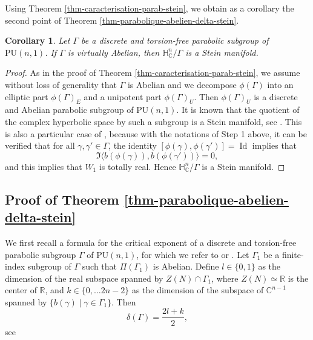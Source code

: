\documentclass{article}
\newtheorem{corollary}[theorem]{Corollary}
\theoremstyle{definition}
\theoremstyle{remark}
\newcommand{\C}{\mathbb{C}}
\newcommand{\R}{\mathbb{R}}
\newcommand{\HNC}{\mathbb{H}^{n}_{\C}}
\newcommand{\PU}{\mathrm{PU}}
\DeclareMathOperator{\Id}{\text{Id}}
\begin{document}
	Using Theorem \ref{thm-caracterisation-parab-stein}, we obtain as a corollary the second point of Theorem \ref{thm-parabolique-abelien-delta-stein}.
	
	\begin{corollary}\label{cor-virt-ab-stein}
		Let $\Gamma$ be a discrete and torsion-free parabolic subgroup of $\PU(n,1)$. If $\Gamma$ is virtually Abelian, then $\HNC/\Gamma$ is a Stein manifold.
	\end{corollary}
	
	\begin{proof}
		As in the proof of Theorem \ref{thm-caracterisation-parab-stein}, we assume without loss of generality that $\Gamma$ is Abelian and we decompose $\phi(\Gamma)$ into an elliptic part $\phi(\Gamma)_E$ and a unipotent part $\phi(\Gamma)_U$. Then $\phi(\Gamma)_U$ is a discrete and Abelian parabolic subgroup of $\PU(n,1)$. It is known that the quotient of the complex hyperbolic space by such a subgroup is a Stein manifold, see \cite{chenDiscreteGroupsHolomorphic2013}. This is also a particular case of \cite[Theorem 1.4]{miebachQuotientsBoundedHomogeneous2024}, because with the notations of Step 1 above, it can be verified that for all $\gamma,\gamma'\in \Gamma$, the identity $[\phi(\gamma),\phi(\gamma')]=\Id$ implies that
		\begin{equation*}
			\Im\langle b(\phi(\gamma)),b(\phi(\gamma'))\rangle = 0,
		\end{equation*}
		and this implies that $W_1$ is totally real. Hence $\HNC/\Gamma$ is a Stein manifold.
	\end{proof}
	\subsection{Proof of Theorem \ref{thm-parabolique-abelien-delta-stein}}
	
	We first recall a formula for the critical exponent of a discrete and torsion-free parabolic subgroup $\Gamma$ of $\PU(n,1)$, for which we refer to \cite{corletteLimitSetsDiscrete1999} or \cite[§3]{dalboSeriesPoincareGroupes2000}. Let $\Gamma_1$ be a finite-index subgroup of $\Gamma$ such that $\Pi(\Gamma_1)$ is Abelian. Define $l\in\{0,1\}$ as the dimension of the real subspace spanned by $Z(N)\cap \Gamma_1$, where $Z(N)\simeq\R$ is the center of $\R$, and $k\in\{0,\dots 2n-2\}$ as the dimension of the subspace of $\C^{n-1}$ spanned by $\{b(\gamma) \mid \gamma \in \Gamma_1\}$. Then\begin{equation}\label{eq-delta-parab}
		\delta(\Gamma) = \frac{2l+k}{2},
	\end{equation}
	see \cite[Proof of Lemma 3.5]{corletteLimitSetsDiscrete1999}
	
\end{document}
